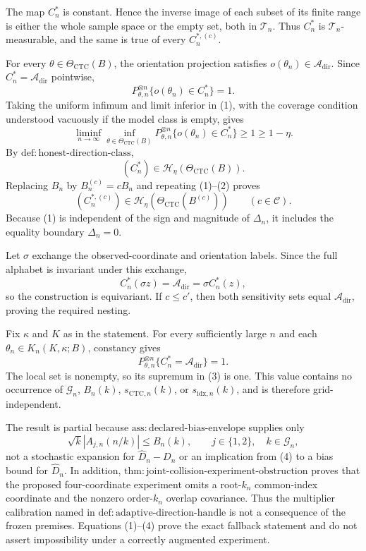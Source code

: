 The map \(C_n^*\) is constant.  Hence the inverse image of each subset of its finite range is either the whole sample space or the empty set, both in \(\mathcal T_n\).  Thus \(C_n^*\) is \(\mathcal T_n\)-measurable, and the same is true of every \(C_n^{*,(c)}\).

For every \(\theta\in\Theta_{\mathrm{CTC}}(B)\), the orientation projection satisfies \(o(\theta_n)\in\mathcal A_{\mathrm{dir}}\).  Since \(C_n^*=\mathcal A_{\mathrm{dir}}\) pointwise,
\[
 P_{\theta,n}^{\otimes n}\{o(\theta_n)\in C_n^*\}=1. \tag{1}
\]
Taking the uniform infimum and limit inferior in (1), with the coverage condition understood vacuously if the model class is empty, gives
\[
 \liminf_{n\to\infty}\inf_{\theta\in\Theta_{\mathrm{CTC}}(B)}
 P_{\theta,n}^{\otimes n}\{o(\theta_n)\in C_n^*\}
 \geq1\geq1-\eta.
\]
By \(\mathrm{def{:}honest\text{-}direction\text{-}class}\),
\[
 (C_n^*)\in\mathcal H_\eta(\Theta_{\mathrm{CTC}}(B)). \tag{2}
\]
Replacing \(B_n\) by \(B_n^{(c)}=cB_n\) and repeating (1)--(2) proves
\[
 (C_n^{*,(c)})\in\mathcal H_\eta(\Theta_{\mathrm{CTC}}(B^{(c)}))
 \qquad(c\in\mathcal C).
\]
Because (1) is independent of the sign and magnitude of \(\Delta_n\), it includes the equality boundary \(\Delta_n=0\).

Let \(\sigma\) exchange the observed-coordinate and orientation labels.  Since the full alphabet is invariant under this exchange,
\[
 C_n^*(\sigma z)=\mathcal A_{\mathrm{dir}}
 =\sigma C_n^*(z),
\]
so the construction is equivariant.  If \(c\leq c'\), then both sensitivity sets equal \(\mathcal A_{\mathrm{dir}}\), proving the required nesting.

Fix \(\kappa\) and \(K\) as in the statement.  For every sufficiently large \(n\) and each \(\theta_n\in K_n(K,\kappa;B)\), constancy gives
\[
 P_{\theta,n}^{\otimes n}\{C_n^*=\mathcal A_{\mathrm{dir}}\}=1. \tag{3}
\]
The local set is nonempty, so its supremum in (3) is one.  This value contains no occurrence of \(\mathcal G_n\), \(B_n(k)\), \(s_{\mathrm{CTC},n}(k)\), or \(s_{\mathrm{idx},n}(k)\), and is therefore grid-independent.

The result is partial because \(\mathrm{ass{:}declared\text{-}bias\text{-}envelope}\) supplies only
\[
 \sqrt{k}|A_{j,n}(n/k)|\leq B_n(k),
 \qquad j\in\{1,2\},\quad k\in\mathcal G_n, \tag{4}
\]
not a stochastic expansion for \(\widehat D_n-D_n\) or an implication from (4) to a bias bound for \(\widehat D_n\).  In addition, \(\mathrm{thm{:}joint\text{-}collision\text{-}experiment\text{-}obstruction}\) proves that the proposed four-coordinate experiment omits a root-\(k_n\) common-index coordinate and the nonzero order-\(k_n\) overlap covariance.  Thus the multiplier calibration named in \(\mathrm{def{:}adaptive\text{-}direction\text{-}handle}\) is not a consequence of the frozen premises.  Equations (1)--(4) prove the exact fallback statement and do not assert impossibility under a correctly augmented experiment.